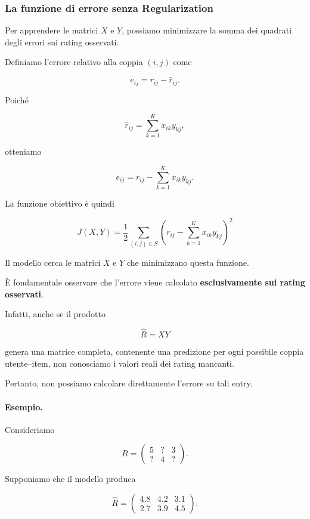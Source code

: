 \subsubsection{La funzione di errore senza Regularization}

Per apprendere le matrici $X$ e $Y$, possiamo minimizzare
la somma dei quadrati degli errori sui rating osservati.

Definiamo l'errore relativo alla coppia $(i,j)$ come

\[
e_{ij}
=
r_{ij}-\widehat{r}_{ij}.
\]

Poiché

\[
\widehat{r}_{ij}
=
\sum_{k=1}^{K}x_{ik}y_{kj},
\]

otteniamo

\[
e_{ij}
=
r_{ij}
-
\sum_{k=1}^{K}x_{ik}y_{kj}.
\]

La funzione obiettivo è quindi

\[
\boxed{
J(X,Y)
=
\frac{1}{2}
\sum_{(i,j)\in S}
\left(
r_{ij}
-
\sum_{k=1}^{K}x_{ik}y_{kj}
\right)^2
}
\]

Il modello cerca le matrici $X$ e $Y$ che minimizzano
questa funzione.

È fondamentale osservare che l'errore viene calcolato
\textbf{esclusivamente sui rating osservati}.

Infatti, anche se il prodotto

\[
\widehat{R}=XY
\]

genera una matrice completa, contenente una predizione
per ogni possibile coppia utente--item, non conosciamo
i valori reali dei rating mancanti.

Pertanto, non possiamo calcolare direttamente l'errore
su tali entry.

\paragraph{Esempio.}

Consideriamo

\[
R=
\begin{pmatrix}
5 & ? & 3\\
? & 4 & ?
\end{pmatrix}.
\]

Supponiamo che il modello produca

\[
\widehat{R}
=
\begin{pmatrix}
4.8 & 4.2 & 3.1\\
2.7 & 3.9 & 4.5
\end{pmatrix}.
\]

